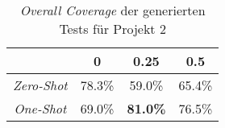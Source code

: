 \bgroup
\def\arraystretch{2}
\begin{table}[H]
	\vspace{.5cm}
	\centering		
	\begin{center}
		\begin{tabular}{|c||c|c|c|}
			\hline 
			& 0 & 0.25 & 0.5 \\
			\hline 
			\hline
			\textit{Zero-Shot} & 78.3\% & 59.0\% & 65.4\% \\
			\hline
			\textit{One-Shot} & 69.0\% & \textbf{81.0\%} & 76.5\% \\
			\hline
		\end{tabular} 
	\end{center}
	\caption{\textit{Overall Coverage} der generierten Tests für Projekt 2}
	\label{fig:o-2}
	\vspace{-.8cm}
\end{table}
\egroup